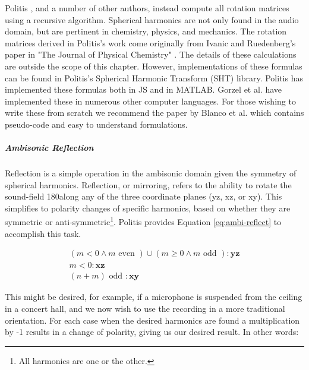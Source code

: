
Politis \cite{politis2016jsambisonics}, and a number of other authors, instead compute all rotation matrices using a recursive algorithm. Spherical harmonics are not only found in the audio domain, but are pertinent in chemistry, physics, and mechanics. The rotation matrices derived in Politis's work come originally from Ivanic and Ruedenberg's paper in "The Journal of Physical Chemistry" \cite{ivanic1996rotation}. 
The details of these calculations are outside the scope of this chapter. However, implementations of these formulas can be found in Politis's Spherical Harmonic Transform (SHT) library. Politis has implemented these formulas both in JS and in MATLAB. Gorzel et al. \cite{gorzel2019efficient} have implemented these in numerous other computer languages. For those wishing to write these from scratch we recommend the paper by Blanco et al. \cite{blanco1997evaluation} which contains pseudo-code and easy to understand formulations. 

\subparagraph{Ambisonic Reflection}

Reflection is a simple operation in the ambisonic domain given the symmetry of spherical harmonics. Reflection, or mirroring, refers to the ability to rotate the sound-field 180\textdegree along any of the three coordinate planes (yz, xz, or xy). This simplifies to polarity changes of specific harmonics, based on whether they are symmetric or anti-symmetric\footnote{All harmonics are one or the other.}. Politis provides Equation \ref{eq:ambi-reflect} to accomplish this task.

\begin{equation}
\begin{aligned}
(m<0 \wedge m \text { even }) \cup(m \geq 0 \wedge m \text { odd }):  \mathbf{y z}\\
m<0: \mathbf{x z}\\
(n+m) \text { odd }: \mathbf{x y} 
\end{aligned}
\label{eq:ambi-reflect}
\end{equation}

This might be desired, for example, if a microphone is suspended from the ceiling in a concert hall, and we now wish to use the recording in a more traditional orientation. For each case when the desired harmonics are found a multiplication by -1 results in a change of polarity, giving us our desired result. In other words:

